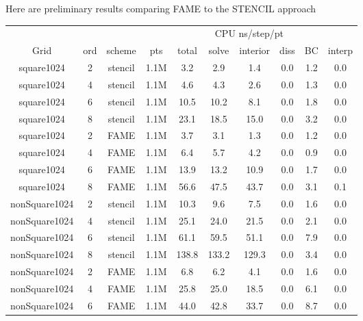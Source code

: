Here are preliminary results comparing FAME to the STENCIL approach
{
\begin{table}[hbt] \small
\centering
\begin{tabular}{|c|c|c|c|c|c|c|c|c|c|} \hline
            &        &       & \multicolumn{7}{c|}{CPU ns/step/pt}  \\ 
   Grid         & ord & scheme & pts   & total   &  solve  &  interior  & diss  &   BC  & interp \\  \hline
  square1024 & 2 & stencil  & 1.1M  &     3.2 &     2.9 &     1.4 &     0.0 &     1.2 &     0.0   \\
  square1024 & 4 & stencil  & 1.1M  &     4.6 &     4.3 &     2.6 &     0.0 &     1.3 &     0.0   \\
  square1024 & 6 & stencil  & 1.1M  &    10.5 &    10.2 &     8.1 &     0.0 &     1.8 &     0.0   \\
  square1024 & 8 & stencil  & 1.1M  &    23.1 &    18.5 &    15.0 &     0.0 &     3.2 &     0.0   \\
  \hline 
  square1024 & 2 & FAME  & 1.1M  &     3.7 &     3.1 &     1.3 &     0.0 &     1.2 &     0.0   \\
  square1024 & 4 & FAME  & 1.1M  &     6.4 &     5.7 &     4.2 &     0.0 &     0.9 &     0.0   \\
  square1024 & 6 & FAME  & 1.1M  &    13.9 &    13.2 &    10.9 &     0.0 &     1.7 &     0.0   \\
  square1024 & 8 & FAME  & 1.1M  &    56.6 &    47.5 &    43.7 &     0.0 &     3.1 &     0.1   \\
  \hline 
  \hline 
  nonSquare1024 & 2 & stencil  & 1.1M  &    10.3 &     9.6 &     7.5 &     0.0 &     1.6 &     0.0   \\
  nonSquare1024 & 4 & stencil  & 1.1M  &    25.1 &    24.0 &    21.5 &     0.0 &     2.1 &     0.0   \\
  nonSquare1024 & 6 & stencil  & 1.1M  &    61.1 &    59.5 &    51.1 &     0.0 &     7.9 &     0.0   \\
  nonSquare1024 & 8 & stencil  & 1.1M  &   138.8 &   133.2 &   129.3 &     0.0 &     3.4 &     0.0   \\  
  \hline
  nonSquare1024 & 2 & FAME  & 1.1M  &     6.8 &     6.2 &     4.1 &     0.0 &     1.6 &     0.0   \\
  nonSquare1024 & 4 & FAME  & 1.1M  &    25.8 &    25.0 &    18.5 &     0.0 &     6.1 &     0.0   \\
  nonSquare1024 & 6 & FAME  & 1.1M  &    44.0 &    42.8 &    33.7 &     0.0 &     8.7 &     0.0   \\

\end{tabular}
\end{table}}
